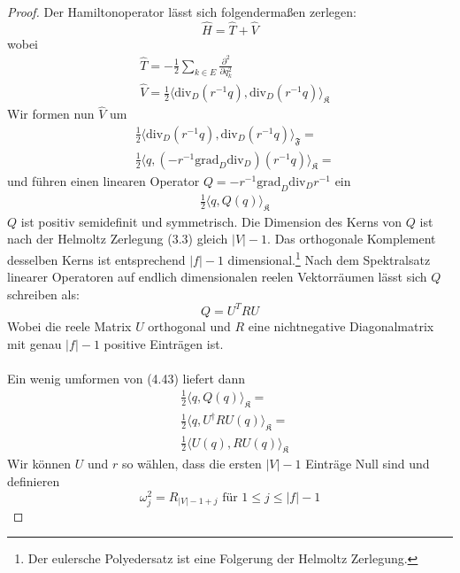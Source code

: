 \documentclass[11pt,a4paper,leqno]{report}
\numberwithin{equation}{chapter}
\begin{document}
\begin{proof}
	Der Hamiltonoperator l\"asst sich folgenderma\ss{}en zerlegen:
	\begin{equation*}
		\hat{H} = \hat{T} + \hat{V}
	\end{equation*}
	wobei
	\begin{align*}
		&\hat{T} = -\frac{1}{2}\sum_{k\in E}\frac{\partial^2}{\partial q_k^2}\\
	    &\hat{V} = \frac{1}{2}\langle \text{div}_D(r^{-1}q), \text{div}_D(r^{-1}q)\rangle_{\mathfrak{K}}
	\end{align*}
	Wir formen nun $\hat{V}$ um
	\begin{align*}
		&\frac{1}{2}\langle \text{div}_D(r^{-1}q), \text{div}_D(r^{-1}q)\rangle_{\mathfrak{F}}=\\
		&\frac{1}{2}\langle q, (-r^{-1}\text{grad}_D\text{div}_D)(r^{-1}q)\rangle_{\mathfrak{K}}=
	\end{align*}
	und f\"uhren einen linearen Operator $Q=-r^{-1}\text{grad}_D\text{div}_Dr^{-1}$ ein
	\begin{align}
		&\frac{1}{2}\langle q, Q(q)\rangle_{\mathfrak{K}}
	\end{align}
	$Q$ ist positiv semidefinit und symmetrisch. Die Dimension des Kerns von $Q$ ist nach der Helmoltz Zerlegung (3.3) gleich $|V| - 1$. Das orthogonale Komplement desselben Kerns ist entsprechend $|f| - 1$ dimensional.\footnote{Der eulersche Polyedersatz ist eine Folgerung der Helmoltz Zerlegung.}
	Nach dem Spektralsatz linearer Operatoren auf endlich dimensionalen reelen Vektorr\"aumen l\"asst sich $Q$ schreiben als:
	\begin{equation*}
		Q = U^T R U
	\end{equation*}
	Wobei die reele Matrix $U$ orthogonal und $R$ eine nichtnegative Diagonalmatrix mit genau $|f| - 1$ positive Eintr\"agen ist. \\
	\\
	Ein wenig umformen von (4.43) liefert dann
	\begin{align*}
		&\frac{1}{2}\langle q, Q(q)\rangle_{\mathfrak{K}}=\\
		&\frac{1}{2}\langle q, U^\dagger R U(q)\rangle_{\mathfrak{K}}=\\
		&\frac{1}{2}\langle U(q), R U(q)\rangle_{\mathfrak{K}}
	\end{align*}
	Wir k\"onnen $U$ und $r$ so w\"ahlen, dass die ersten $|V|-1$ Eintr\"age Null sind und definieren 
	\begin{equation*}
		\omega_j^2 = R_{|V|-1 + j} \text{ f\"ur }1\leq j \leq |f| - 1

\end{equation*}
\end{proof}
\end{document}
